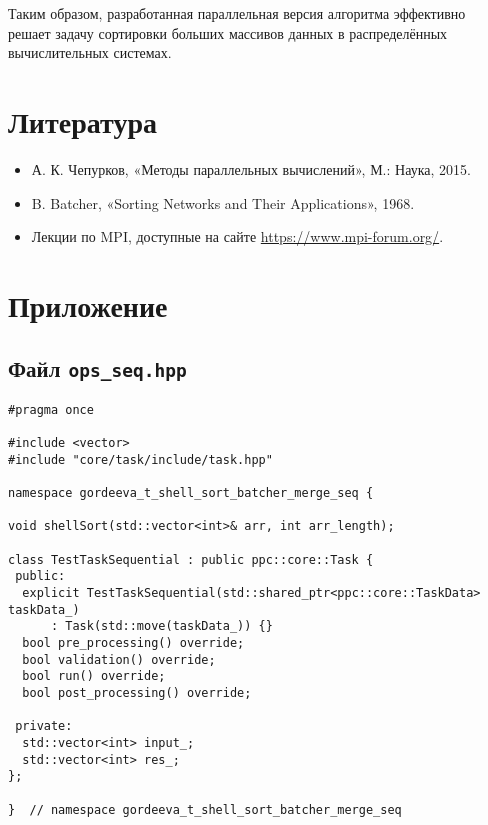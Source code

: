 \documentclass[a4paper,12pt]{article}
\begin{document}
Таким образом, разработанная параллельная версия алгоритма эффективно решает задачу сортировки больших массивов данных в распределённых вычислительных системах.

\section{Литература}
\begin{itemize}
    \item А. К. Чепурков, «Методы параллельных вычислений», М.: Наука, 2015.
    \item B. Batcher, «Sorting Networks and Their Applications», 1968.
    \item Лекции по MPI, доступные на сайте \url{https://www.mpi-forum.org/}.
\end{itemize}

\section{Приложение}

\subsection{Файл \texttt{ops\_seq.hpp}}
\begin{verbatim}
#pragma once

#include <vector>
#include "core/task/include/task.hpp"

namespace gordeeva_t_shell_sort_batcher_merge_seq {

void shellSort(std::vector<int>& arr, int arr_length);

class TestTaskSequential : public ppc::core::Task {
 public:
  explicit TestTaskSequential(std::shared_ptr<ppc::core::TaskData> taskData_)
      : Task(std::move(taskData_)) {}
  bool pre_processing() override;
  bool validation() override;
  bool run() override;
  bool post_processing() override;

 private:
  std::vector<int> input_;
  std::vector<int> res_;
};

}  // namespace gordeeva_t_shell_sort_batcher_merge_seq
\end{verbatim}
\end{document}
